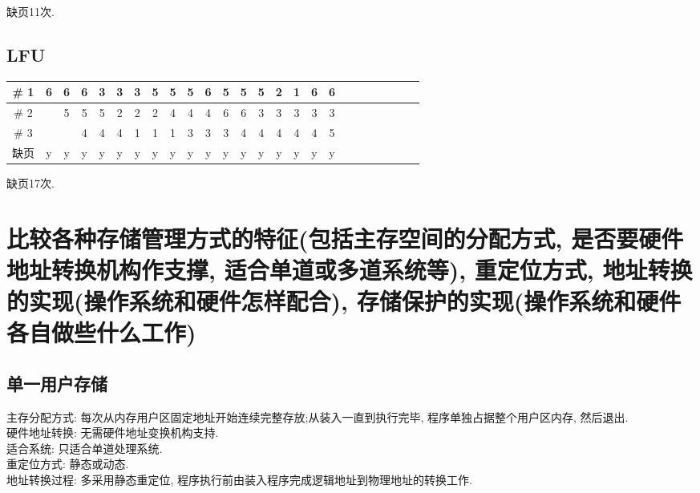 \documentclass[a4paper, 12pt, notitlepage]{article}
\begin{document}
	缺页11次. 
	
\subsection{LFU}
		
\begin{table}[H]
\centering

	\begin{tabular}{|c|c|c|c|c|c|c|c|c|c|c|c|c|c|c|c|c|c|c|c|c|c|c|c|c|}
		\hline
		\# 1 & 6 & 6 & 6 & 3 & 3 & 3 & 5 & 5 & 5 & 6 & 5 & 5 & 5 & 2 & 1 & 6 & 6 \\
		\hline
		\# 2 &   & 5 & 5 & 5 & 2 & 2 & 2 & 4 & 4 & 4 & 6 & 6 & 3 & 3 & 3 & 3 & 3 \\
		\hline
		\# 3 &   &   & 4 & 4 & 4 & 1 & 1 & 1 & 3 & 3 & 3 & 4 & 4 & 4 & 4 & 4 & 5 \\
		\hline
		缺页 & y & y & y & y & y & y & y & y & y & y & y & y & y & y & y & y & y \\
		\hline	
	\end{tabular}

\end{table}

	缺页17次. 

\section{比较各种存储管理方式的特征(包括主存空间的分配方式, 是否要硬件地址转换机构作支撑, 适合单道或多道系统等), 重定位方式, 地址转换的实现(操作系统和硬件怎样配合), 存储保护的实现(操作系统和硬件各自做些什么工作)}

\subsection{单一用户存储}

	主存分配方式: 每次从内存用户区固定地址开始连续完整存放;从装入一直到执行完毕, 程序单独占据整个用户区内存, 然后退出. \\
	
	硬件地址转换: 无需硬件地址变换机构支持. \\
	
	适合系统: 只适合单道处理系统. \\
	
	重定位方式: 静态或动态. \\
	
	地址转换过程: 多采用静态重定位, 程序执行前由装入程序完成逻辑地址到物理地址的转换工作. \\
	
\end{document}
